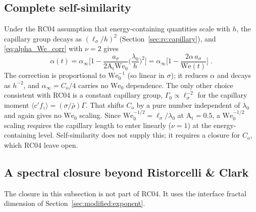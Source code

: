 \documentclass[11pt]{article}
\numberwithin{equation}{section}
\newcommand{\avg}[1]{\langle #1\rangle}
\newcommand{\At}{\mathrm{A_t}}
\newcommand{\We}{\mathrm{We}_0}
\newcommand{\ls}{\ell_\sigma}
\begin{document}
\subsection{Complete self-similarity}\label{sec:scaling:rc}
Under the RC04 assumption that energy-containing quantities scale with $h$, the capillary group decays as $(\ls/h)^2$ (Section~\ref{sec:rc:capillary}), and \eqref{eq:alpha_We_corr} with $\nu = 2$ gives
\begin{equation}\label{eq:scaling_rc}
\alpha(t) = \alpha_\infty \Big[1 - \frac{a_\sigma}{2 \At \We} \Big(\frac{\lambda_0}{h}\Big)^2\Big]
= \alpha_\infty \Big[1 - \frac{2 \alpha \, a_\sigma}{\mathrm{We}(t)}\Big] \;.
\end{equation}
The correction is proportional to $\We^{-1}$ (so linear in $\sigma$); it reduces $\alpha$ and decays as $h^{-2}$, and $\alpha_\infty = C_\mathrm{o}/4$ carries no $\We$ dependence. The only other choice consistent with RC04 is a constant capillary group, $\Gamma_0 \propto \ls^{-2}$ for the capillary moment $\avg{c' f_z} = (\sigma/\bar\rho) \Gamma$. That shifts $C_\mathrm{o}$ by a pure number independent of $\lambda_0$ and again gives no $\We$ scaling. Since $\We^{-1/2} = \ls/\lambda_0$ at $\At = 0.5$, a $\We^{-1/2}$ scaling requires the capillary length to enter linearly ($\nu = 1$) at the energy-containing level. Self-similarity does not supply this; it requires a closure for $C_\mathrm{o}$, which RC04 leave open.

\subsection{A spectral closure beyond Ristorcelli \& Clark}\label{sec:scaling:closure}
The closure in this subsection is not part of RC04. It uses the interface fractal dimension of Section~\ref{sec:modified:exponent}.
\end{document}
